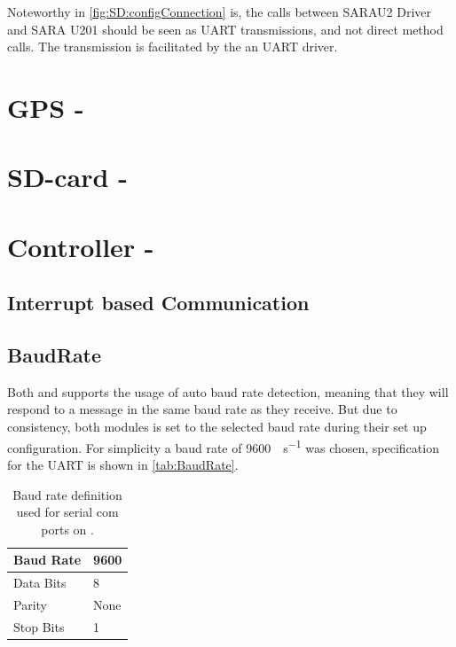 Noteworthy in \cref{fig:SD:configConnection} is, the calls between SARAU2 Driver and SARA U201 should be seen as UART transmissions, and not direct method calls. The transmission is facilitated by the an UART driver. 

\section{GPS - \GPS}





\section{SD-card - \SDsock}


\section{Controller - \SAMD}

\subsection{Interrupt based Communication}


\subsection{BaudRate}
Both \SARA and \GPS supports the usage of auto baud rate detection, meaning that they will respond to a message in the same baud rate as they receive.
But due to consistency, both modules is set to the selected baud rate during their set up configuration. 
For simplicity a baud rate of \SI[per-mode = symbol]{9600}{\bit\per\second} was chosen, specification for the UART is shown in \vref{tab:BaudRate}.

\begin{table}[H]
	\begin{tabular}{ll}
		\hline 
		Baud Rate & 9600 \\ 
		\hline 
		Data Bits & 8 \\ 
		\hline 
		Parity & None \\ 
		\hline 
		Stop Bits & 1 \\ 
		\hline 
	\end{tabular}
	\centering
	\caption{Baud rate definition used for serial com ports on \SAMD.}
	\label{tab:BaudRate}
\end{table} 

\FloatBarrier
